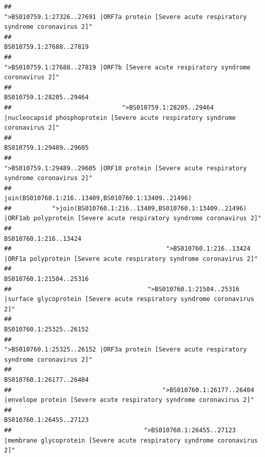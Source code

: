 \documentclass[
]{article}
\begin{document}
\begin{verbatim}
##                                            ">BS010759.1:27326..27691 |ORF7a protein [Severe acute respiratory syndrome coronavirus 2]" 
##                                                                                                                BS010759.1:27688..27819 
##                                                    ">BS010759.1:27688..27819 |ORF7b [Severe acute respiratory syndrome coronavirus 2]" 
##                                                                                                                BS010759.1:28205..29464 
##                              ">BS010759.1:28205..29464 |nucleocapsid phosphoprotein [Severe acute respiratory syndrome coronavirus 2]" 
##                                                                                                                BS010759.1:29489..29605 
##                                            ">BS010759.1:29489..29605 |ORF10 protein [Severe acute respiratory syndrome coronavirus 2]" 
##                                                                                    join(BS010760.1:216..13409,BS010760.1:13409..21496) 
##           ">join(BS010760.1:216..13409,BS010760.1:13409..21496) |ORF1ab polyprotein [Severe acute respiratory syndrome coronavirus 2]" 
##                                                                                                                  BS010760.1:216..13424 
##                                          ">BS010760.1:216..13424 |ORF1a polyprotein [Severe acute respiratory syndrome coronavirus 2]" 
##                                                                                                                BS010760.1:21504..25316 
##                                     ">BS010760.1:21504..25316 |surface glycoprotein [Severe acute respiratory syndrome coronavirus 2]" 
##                                                                                                                BS010760.1:25325..26152 
##                                            ">BS010760.1:25325..26152 |ORF3a protein [Severe acute respiratory syndrome coronavirus 2]" 
##                                                                                                                BS010760.1:26177..26404 
##                                         ">BS010760.1:26177..26404 |envelope protein [Severe acute respiratory syndrome coronavirus 2]" 
##                                                                                                                BS010760.1:26455..27123 
##                                    ">BS010760.1:26455..27123 |membrane glycoprotein [Severe acute respiratory syndrome coronavirus 2]" 

\end{verbatim}
\end{document}
